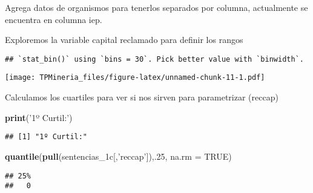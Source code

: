 \documentclass[runningheads,a4paper]{llncs}
\newenvironment{Shaded}{}{}
\newcommand{\KeywordTok}[1]{\textcolor[rgb]{0.00,0.44,0.13}{\textbf{{#1}}}}
\newcommand{\DataTypeTok}[1]{\textcolor[rgb]{0.56,0.13,0.00}{{#1}}}
\newcommand{\DecValTok}[1]{\textcolor[rgb]{0.25,0.63,0.44}{{#1}}}
\newcommand{\StringTok}[1]{\textcolor[rgb]{0.25,0.44,0.63}{{#1}}}
\newcommand{\OtherTok}[1]{\textcolor[rgb]{0.00,0.44,0.13}{{#1}}}
\newcommand{\NormalTok}[1]{{#1}}
\newcommand{\OperatorTok}[1]{\textcolor[rgb]{0.40,0.40,0.40}{{#1}}}
\begin{document}
Agrega datos de organismos para tenerlos separados por columna,
actualmente se encuentra en columna iep.

\begin{Shaded}
\end{Shaded}

Exploremos la variable capital reclamado para definir los rangos

\begin{verbatim}
## `stat_bin()` using `bins = 30`. Pick better value with `binwidth`.
\end{verbatim}

\texttt{[image: TPMineria\_files/figure-latex/unnamed-chunk-11-1.pdf]}

Calculamos los cuartiles para ver si nos sirven para parametrizar
(reccap)

\begin{Shaded}
\begin{Highlighting}[]
\KeywordTok{print}\NormalTok{(}\StringTok{'1º Curtil:'}\NormalTok{)}
\end{Highlighting}
\end{Shaded}

\begin{verbatim}
## [1] "1º Curtil:"
\end{verbatim}

\begin{Shaded}
\begin{Highlighting}[]
\KeywordTok{quantile}\NormalTok{(}\KeywordTok{pull}\NormalTok{(sentencias_1c[,}\StringTok{'reccap'}\NormalTok{]),.}\DecValTok{25}\NormalTok{, }\DataTypeTok{na.rm =} \OtherTok{TRUE}\NormalTok{)}
\end{Highlighting}
\end{Shaded}

\begin{verbatim}
## 25% 
##   0
\end{verbatim}
\end{document}
